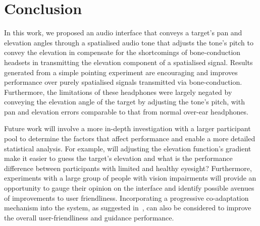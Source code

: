 \documentclass{llncs}
\begin{document}
\section{Conclusion}\label{sec:conclusion}

In this work, we proposed an audio interface that conveys a target's pan and elevation angles through a spatialised audio tone that adjusts the tone's pitch to convey the elevation in compensate for the shortcomings of bone-conduction headsets in transmitting the elevation component of a spatialised signal.
Results generated from a simple pointing experiment are encouraging and improves performance over purely spatialised signals transmitted via bone-conduction.
Furthermore, the limitations of these headphones were largely negated by conveying the elevation angle of the target by adjusting the tone's pitch, with pan and elevation errors comparable to that from normal over-ear headphones.

Future work will involve a more in-depth investigation with a larger participant pool to determine the factors that affect performance and enable a more detailed statistical analysis.
For example, will adjusting the elevation function's gradient make it easier to guess the target's elevation and what is the performance difference between participants with limited and healthy eyesight?  
Furthermore, experiments with a large group of people with vision impairments will provide an opportunity to gauge their opinion on the interface and identify possible avenues of improvements to user friendliness.
Incorporating a progressive co-adaptation mechanism into the system, as suggested in~\cite{gallina2015progressive}, can also be considered to improve the overall user-friendliness and guidance performance.



\end{document}
